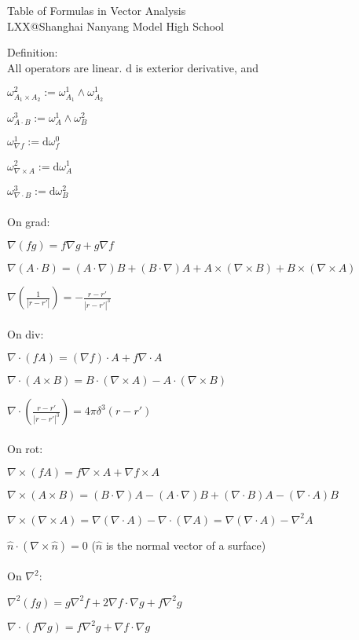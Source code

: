 \documentclass[10pt]{article}
\begin{document}
\begin{center}
\Large{Table of Formulas in Vector Analysis}\\
\footnotesize{LXX@Shanghai Nanyang Model High School}
\end{center}
\noindent Definition:\\
All operators are linear. $\mathrm{d}$ is exterior derivative, and 

$\omega_{A_1\times A_2}^2:=\omega_{A_1}^1\wedge \omega_{A_2}^1$

$\omega_{A\cdot B}^3:=\omega_{A}^1\wedge \omega_{B}^2$

$\omega_{\nabla f}^1:=\mathrm{d}\omega_{f}^0$

$\omega_{\nabla \times A}^2:=\mathrm{d}\omega_{A}^1$

$\omega_{\nabla \cdot B}^3:=\mathrm{d}\omega_{B}^2$\\
\\
 On grad:
 
$\nabla(fg)=f\nabla g+g\nabla f$

$\nabla(A\cdot B)=(A\cdot \nabla)B+(B\cdot \nabla)A+A\times (\nabla \times B)+B\times (\nabla \times A)$

$\displaystyle{\nabla \left(\frac{1}{|r-r'|} \right) = -\frac{r-r'}{|r-r'|^3}}$\\
\\
 On div:
 
$\nabla\cdot(fA) = (\nabla f) \cdot A + f\nabla\cdot A $

$\nabla\cdot(A \times B) = B\cdot (\nabla \times A)-A\cdot (\nabla \times B)$

$\displaystyle{\nabla\cdot \left(\frac{r-r'}{|r-r'|^3} \right) = 4\pi \delta^3(r-r')}$\\
\\
 On rot:

$\nabla\times(fA)=f\nabla \times A + \nabla f \times A $

$\nabla\times(A\times B)=(B\cdot \nabla)A-(A\cdot \nabla)B+(\nabla\cdot B)A-(\nabla\cdot A)B$

$\nabla\times(\nabla\times A)=\nabla(\nabla\cdot A)-\nabla \cdot (\nabla A)=\nabla(\nabla\cdot A)-\nabla^2 A$

$\hat{n}\cdot (\nabla\times \hat{n})=0$  ($\hat{n}$ is the normal vector of a surface)\\
\\
 On $\nabla^2$:

$\nabla^2(fg)=g\nabla^2 f+2\nabla f\cdot \nabla g+f\nabla^2 g$

$\nabla \cdot (f\nabla g)=f\nabla^2 g+\nabla f\cdot \nabla g$
\end{document}
